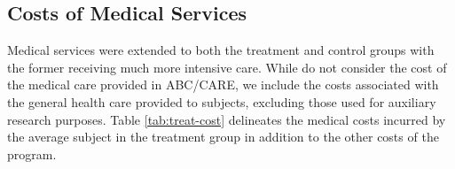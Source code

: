 \begin{comment}
Equipment \& Supplies  & 1,068 & 1,133 &1,133 &1,154 &1,154&5,642 \\ %
Transportation  & 293 & 293 &293 &293 &293 &1,463\\ %
Facilities  & 1,289 & 1,289 &1,289 & 1,289& 1,289&5,445\\ %
Miscellaneous  & 81 & 81 & 81 & 81 & 81&405 \\ %
Food  & 280  & 1,133 &1,417 &1,417 &1,417 &5,664\\ %
\\
\textbf{Total} &3,914&3,994&5,078&5,078&5,078&21,242\\ \hline
\textbf{Total Across Categories}&12,056&13,422&12,501&12,296&12,296&60,788\\ \hline \hline
\end{tabular}
\scriptsize
\begin{tablenotes}
\item Source: \cite{masse2002benefit}. \\
\item Note: This table reports the cost per subject for every year of program participation of the treatment group. All amounts are inflated to 2014 USD. Transportation costs refer to the fuel, general maintenance, insurance cost of daily transportation of treated individuals to and from the center. Costs for facilities are rental costs.
\end{tablenotes}
\end{threeparttable}
\end{table}

\end{comment}

\subsection{Costs of Medical Services} \label{sec:medical}
\noindent Medical services were extended to both the treatment and control groups with the
former receiving much more intensive care. While \cite{Barnett_Masse_2002_benefitcost} do not consider the cost of the medical care provided in ABC/CARE, we include the costs associated with the general health care provided to subjects, excluding
those used for auxiliary research purposes.
Table \ref{tab:treat-cost} delineates the medical costs incurred by the average subject in the treatment group in addition to the other costs of the program. \\

